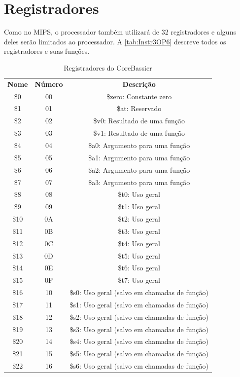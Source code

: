 \documentclass[
	12pt,
	openright,
	a4paper,
	english,			
	french,				
	spanish,			
	brazil,				
	]{abntex2}
\begin{document}
\section{Registradores}
Como no MIPS, o processador também utilizará de 32 registradores e alguns deles serão limitados ao processador. A \autoref{tab:Instr3OP6} descreve todos os registradores e suas funções.
\begin{table}[htb]
\centering
\ABNTEXfontereduzida
\caption{Registradores do CoreBassier} \label{tab:Instr3OP6}
\begin{tabular}{ ccc }
	
 	\textbf{Nome} & \textbf{Número} & \textbf{Descrição}\\
 	\$0 & 00 & \$zero: Constante zero\\
 	\$1 & 01 & \$at: Reservado\\
 	\$2 & 02 & \$v0: Resultado de uma função\\
 	\$3 & 03 & \$v1: Resultado de uma função\\
 	\$4 & 04 & \$a0: Argumento para uma função\\
 	\$5 & 05 & \$a1: Argumento para uma função\\
 	\$6 & 06 & \$a2: Argumento para uma função\\
 	\$7 & 07 & \$a3: Argumento para uma função\\
 	\$8 & 08 & \$t0: Uso geral\\
 	\$9 & 09 & \$t1: Uso geral\\
 	\$10 & 0A & \$t2: Uso geral\\
 	\$11 & 0B & \$t3: Uso geral\\
 	\$12 & 0C & \$t4: Uso geral\\
 	\$13 & 0D & \$t5: Uso geral\\
 	\$14 & 0E & \$t6: Uso geral\\
 	\$15 & 0F & \$t7: Uso geral\\
 	\$16 & 10 & \$s0: Uso geral (salvo em chamadas de função)\\
 	\$17 & 11 & \$s1: Uso geral (salvo em chamadas de função)\\
 	\$18 & 12 & \$s2: Uso geral (salvo em chamadas de função)\\
 	\$19 & 13 & \$s3: Uso geral (salvo em chamadas de função)\\
 	\$20 & 14 & \$s4: Uso geral (salvo em chamadas de função)\\
 	\$21 & 15 & \$s5: Uso geral (salvo em chamadas de função)\\
 	\$22 & 16 & \$s6: Uso geral (salvo em chamadas de função)\\

\end{tabular}
\end{table}
\end{document}
